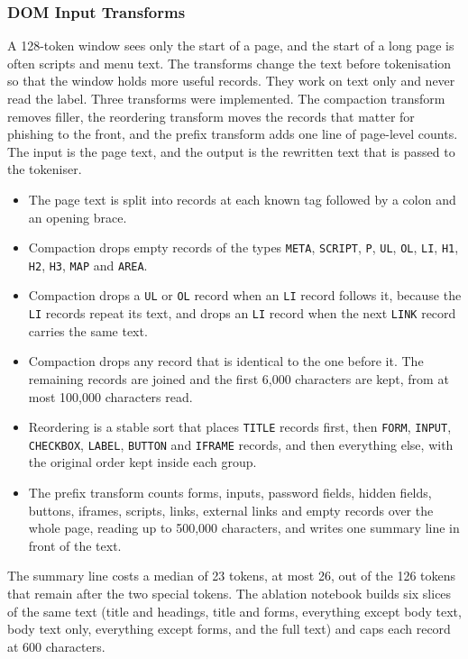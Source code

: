 \documentclass{FastFyp}
\begin{document}
\subsubsection{DOM Input Transforms}
\label{sec:impl-transforms}
A 128-token window sees only the start of a page, and the start of a long page is often scripts and menu text. The transforms change the text before tokenisation so that the window holds more useful records. They work on text only and never read the label. Three transforms were implemented. The compaction transform removes filler, the reordering transform moves the records that matter for phishing to the front, and the prefix transform adds one line of page-level counts. The input is the page text, and the output is the rewritten text that is passed to the tokeniser.
\begin{itemize}
	\item The page text is split into records at each known tag followed by a colon and an opening brace.
	\item Compaction drops empty records of the types \texttt{META}, \texttt{SCRIPT}, \texttt{P}, \texttt{UL}, \texttt{OL}, \texttt{LI}, \texttt{H1}, \texttt{H2}, \texttt{H3}, \texttt{MAP} and \texttt{AREA}.
	\item Compaction drops a \texttt{UL} or \texttt{OL} record when an \texttt{LI} record follows it, because the \texttt{LI} records repeat its text, and drops an \texttt{LI} record when the next \texttt{LINK} record carries the same text.
	\item Compaction drops any record that is identical to the one before it. The remaining records are joined and the first 6,000 characters are kept, from at most 100,000 characters read.
	\item Reordering is a stable sort that places \texttt{TITLE} records first, then \texttt{FORM}, \texttt{INPUT}, \texttt{CHECKBOX}, \texttt{LABEL}, \texttt{BUTTON} and \texttt{IFRAME} records, and then everything else, with the original order kept inside each group.
	\item The prefix transform counts forms, inputs, password fields, hidden fields, buttons, iframes, scripts, links, external links and empty records over the whole page, reading up to 500,000 characters, and writes one summary line in front of the text.
\end{itemize}
The summary line costs a median of 23 tokens, at most 26, out of the 126 tokens that remain after the two special tokens. The ablation notebook builds six slices of the same text (title and headings, title and forms, everything except body text, body text only, everything except forms, and the full text) and caps each record at 600 characters.
\end{document}

